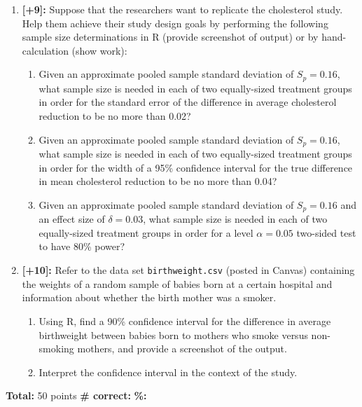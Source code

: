 \documentclass[11pt]{article}
\begin{document}
\begin{enumerate}
\item \textbf{[+9]:} Suppose that the researchers want to replicate the cholesterol study. Help them achieve their study design goals by performing the following sample size determinations in R (provide screenshot of output) or by hand-calculation (show work):
	\begin{enumerate}
	\item Given an approximate pooled sample standard deviation of $S_p = 0.16$, what sample size is needed in each of two equally-sized treatment groups in order for the standard error of the difference in average cholesterol reduction to be no more than 0.02?
	\vspace{2.25in}
	\item Given an approximate pooled sample standard deviation of $S_p = 0.16$, what sample size is needed in each of two equally-sized treatment groups in order for the width of a 95\% confidence interval for the true difference in mean cholesterol reduction to be no more than 0.04?
	\vspace{2.25in}
	\item Given an approximate pooled sample standard deviation of $S_p = 0.16$ and an effect size of $\delta=0.03$, what sample size is needed in each of two equally-sized treatment groups in order for a level $\alpha=0.05$ two-sided test to have 80\% power?
	\vspace{2.25in}
	\end{enumerate}
	
\item \textbf{[+10]:} Refer to the data set \texttt{birthweight.csv} (posted in Canvas) containing the weights of a random sample of babies born at a certain hospital and information about whether the birth mother was a smoker. 
	\begin{enumerate}
	\item Using R, find a 90\% confidence interval for the difference in average birthweight between babies born to mothers who smoke versus non-smoking mothers, and provide a screenshot of the output.
	\vspace{3in}
	\item Interpret the confidence interval in the context of the study.
	\vspace{3in}
	\end{enumerate}

\end{enumerate}

\vfill
\textbf{Total:} 50 points \hspace{14pt} \textbf{\# correct:} \underline{\hspace{1in}}  \hspace{14pt} \textbf{\%:} \underline{\hspace{1in}} 
\end{document}
